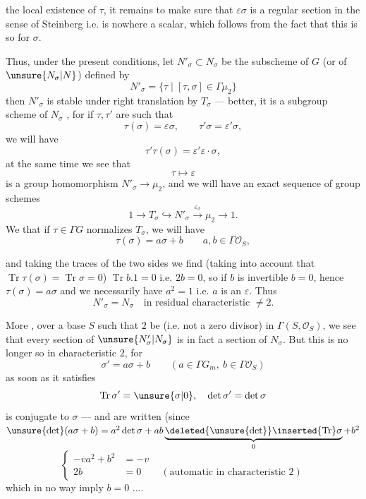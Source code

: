  the local existence of $\tau$, it remains to make sure that
$\varepsilon\sigma$ is a regular section in the sense of Steinberg i.e. is nowhere
a scalar, which follows from the fact that this is so for $\sigma$.

Thus, under the present conditions, let $N'_\sigma\subset N_\sigma$ be the subscheme of
 $G$ (or of $\unsure{N_\sigma|N}$) defined by
\[
\tag{22}
N'_\sigma=\{\tau\mid[\tau,\sigma]\in\Gamma\mu_2\}
\]
then $N'_\sigma$ is stable under right translation by $T_\sigma$ --- better,
it is a subgroup scheme of $N_\sigma$ , for if
$\tau,\tau'$ are such that
\[
\tau(\sigma)=\varepsilon\sigma,\qquad\tau'\sigma=\varepsilon'\sigma,
\]
we will have
\[
\tau'\tau(\sigma)=\varepsilon'\varepsilon\cdot\sigma,
\]
at the same time we see that
\[
\tau\longmapsto\varepsilon
\]
is a group homomorphism $N'_\sigma\longrightarrow\mu_2$, and we will have an exact sequence of
group schemes
\[
\tag{23}
1\longrightarrow T_\sigma\hookrightarrow N'_\sigma
\xrightarrow{\varepsilon_\sigma}\mu_2\longrightarrow1.
\]
We  that if $\tau\in\Gamma G$ normalizes $T_\sigma$, we will have
\[
\tau(\sigma)=a\sigma+b\qquad a,b\in\Gamma\mathcal O_S,
\]

and taking the traces of the two sides we find (taking into account that
$\operatorname{Tr}\tau(\sigma)=\operatorname{Tr}\sigma=0$)
$\operatorname{Tr}b.1=0$ i.e. $2b=0$, so if $b$ is invertible
$b=0$, hence $\tau(\sigma)=a\sigma$ and we necessarily have $a^2=1$ i.e. $a$ is an
$\varepsilon$. Thus
\[
\tag{24}
N'_\sigma=N_\sigma\quad\text{in residual characteristic }\ne2.
\]

More , over a base $S$ such that
$2$  be  
(i.e. not a zero divisor) in $\Gamma(S,\mathcal O_S)$, we see that every section of
$\unsure{N'_\sigma|N_\sigma}$ is in fact a section of $N_\sigma$.
But this is no longer so in characteristic $2$, for
\[
\sigma'=a\sigma+b\qquad(a\in\Gamma G_m,\ b\in\Gamma\mathcal O_S)
\]
as soon as it satisfies
\[
\operatorname{Tr}\sigma'=\unsure{\sigma|0},\quad\det\sigma'=\det\sigma
\]
is conjugate  to $\sigma$ --- and
 
are written (since
$\unsure{\det}(a\sigma+b)=a^2\det\sigma+
 ab\underbrace{\deleted{\unsure{\det}}\inserted{\operatorname{Tr}}\sigma}_{0}+b^2$
\[
\left\{\begin{aligned}
-va^2+b^2&=-v\\
2b&=0\qquad(\text{automatic in characteristic }2)
\end{aligned}\right.
\]
which in no way imply $b=0$ ....


